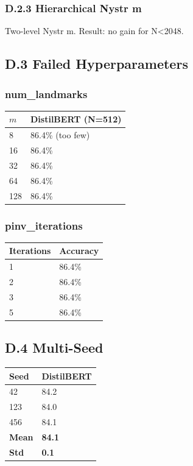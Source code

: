 \subsubsection{D.2.3 Hierarchical Nystr m}

Two-level Nystr m. Result: no gain for N<2048.

\subsection{D.3 Failed Hyperparameters}

\subsubsection{num\_landmarks}

\begin{table}[H]
\centering
\small
\begin{tabular}{ll}
\toprule
\textbf{$m$} & \textbf{DistilBERT (N=512)} \\
\midrule
8 & 86.4\% (too few) \\
16 & 86.4\% \\
32 & 86.4\% \\
64 & 86.4\% \\
128 & 86.4\% \\
\bottomrule
\end{tabular}
\end{table}

\subsubsection{pinv\_iterations}

\begin{table}[H]
\centering
\small
\begin{tabular}{ll}
\toprule
\textbf{Iterations} & \textbf{Accuracy} \\
\midrule
1 & 86.4\% \\
2 & 86.4\% \\
3 & 86.4\% \\
5 & 86.4\% \\
\bottomrule
\end{tabular}
\end{table}

\subsection{D.4 Multi-Seed}

\begin{table}[H]
\centering
\small
\begin{tabular}{ll}
\toprule
\textbf{Seed} & \textbf{DistilBERT} \\
\midrule
42 & 84.2 \\
123 & 84.0 \\
456 & 84.1 \\
\textbf{Mean} & \textbf{84.1} \\
\textbf{Std} & \textbf{0.1} \\
\bottomrule
\end{tabular}
\end{table}

